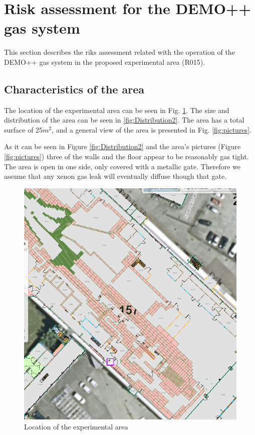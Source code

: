 \section{Risk assessment for the DEMO++ gas system}

This section describes the riks assessment related with the operation of the DEMO++ gas system in the proposed experimental area (R015).

\subsection{Characteristics of the area}

The location of the experimental area can be seen in Fig. \ref{fig:location}. The size and distribution of the area can be seen in \ref{fig:Distribution2}. The area has a total surface of 25$m^2$, and a general view of the area is presented in Fig. \ref{fig:pictures}.

As it can be seen in Figure \ref{fig:Distribution2} and the area's pictures (Figure \ref{fig:pictures}) three of the walls and the floor appear to be reasonably gas tight. The area is open in one side, only covered with a metallic gate. Therefore we assume that any xenon gas leak will eventually diffuse though that gate.  

\begin{figure}
\centering
\includegraphics[angle=0,width=\textwidth]{img/generalmap.png}
\caption{Location of the experimental area} \label{fig:location}
\end{figure}


